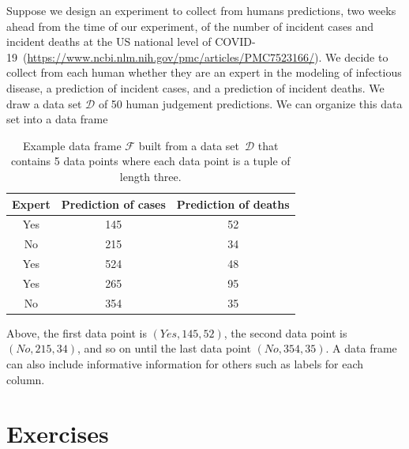 \ex Suppose we design an experiment to collect from humans predictions, two weeks ahead from the time of our experiment, of the number of incident cases and incident deaths at the US national level of COVID-19~(\url{https://www.ncbi.nlm.nih.gov/pmc/articles/PMC7523166/}). We decide to collect from each human whether they are an expert in the modeling of infectious disease,  a prediction of incident cases, and a prediction of incident deaths. We draw a data set $\mathcal{D}$ of 50 human judgement predictions. We can organize this data set into a data frame 
\begin{table}[ht!]
    \centering
    \begin{tabular}{c|c|c}
    Expert & Prediction of cases & Prediction of deaths\\
    \hline
    Yes     & 145    & 52 \\ 
    No      & 215    & 34 \\
    Yes     & 524    & 48 \\
    Yes     & 265    & 95 \\
    No      & 354    & 35 \\
    \end{tabular}
    \caption{Example data frame $\mathcal{F}$ built from a data set~$\mathcal{D}$ that contains 5 data points where each data point is a tuple of length three.}
\end{table}

Above, the first data point is $(Yes,145,52)$, the second data point is $(No, 215, 34)$, and so on until the last data point $(No, 354, 35)$. A data frame can also include informative information for others such as labels for each column.


\section{Exercises}

